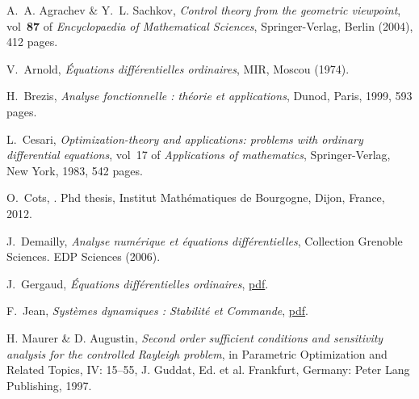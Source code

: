 
\begin{thebibliography}{1}

\newblock A.~A. Agrachev \& Y.~L. Sachkov,
\newblock \emph{Control theory from the geometric viewpoint}, vol~\textbf{87} of \emph{Encyclopaedia of Mathematical Sciences},
\newblock Springer-Verlag, Berlin (2004), 412 pages.

\newblock V.~Arnold, 
\newblock \emph{\'Equations diff\'erentielles ordinaires},
\newblock MIR, Moscou (1974).


\newblock H.~Brezis, 
\newblock \emph{Analyse fonctionnelle : th\'eorie et applications},
\newblock Dunod, Paris, 1999, 593 pages.

\newblock L.~Cesari,
\newblock \emph{Optimization-theory and applications: problems with ordinary differential equations},
                vol~17 of \emph{Applications of mathematics},
\newblock Springer-Verlag, New York, 1983, 542 pages.

\newblock O.~Cots,
.
\newblock Phd thesis, Institut Math\'ematiques de Bourgogne, Dijon, France, 2012.

\newblock J.~Demailly,
\newblock \emph{Analyse num{\'e}rique et {\'e}quations diff{\'e}rentielles},
\newblock Collection Grenoble Sciences. EDP Sciences (2006).

\newblock J.~Gergaud,
\newblock \emph{\'Equations diff\'erentielles ordinaires},
\newblock \href{http://gergaud.perso.enseeiht.fr/teaching/edo/edo_utf8.pdf}{pdf}.

\newblock F.~Jean,
\newblock \emph{Syst\`emes dynamiques : Stabilit\'e et Commande},
\newblock \href{http://perso.ensta-paristech.fr/~fjean/Cours_enligne/AO102.pdf}{pdf}.

\newblock H. Maurer \& D. Augustin,
\newblock \emph{Second order sufficient conditions and sensitivity analysis for the controlled Rayleigh problem},
\newblock in Parametric Optimization and Related Topics, IV: 15–55, J. Guddat, Ed. et al. Frankfurt, Germany: Peter Lang Publishing, 1997.


\end{thebibliography}
